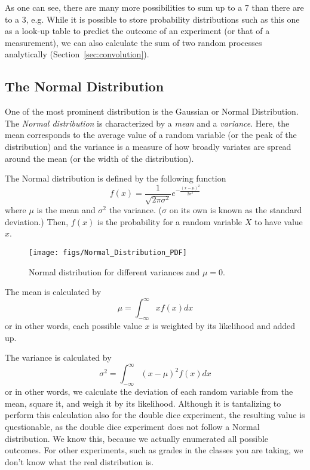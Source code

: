 As one can see, there are many more possibilities to sum up to a 7 than there are to a 3, e.g. While it is possible to store probability distributions such as this one as a look-up table to predict the outcome of an experiment (or that of a measurement), we can also calculate the sum of two random processes analytically (Section~\ref{sec:convolution}).


\subsection{The Normal Distribution}
One of the most prominent distribution is the Gaussian or Normal Distribution. The \emph{Normal distribution} is characterized by a \emph{mean} and a \emph{variance}. Here, the mean corresponds to the average value of a random variable (or the peak of the distribution) and the variance is a measure of how broadly variates are spread around the mean (or the width of the distribution).

 The Normal distribution is defined by the following function
 \begin{equation}
f(x)=\frac{1}{\sqrt{2\pi\sigma^2}}e^{-\frac{(x-\mu)^2}{2\sigma^2}}
\end{equation}
where $ \mu$ is the mean and $ \sigma^2$ the variance. ($ \sigma$ on its own is known as the standard deviation.) Then, $ f(x)$ is the probability for a random variable $ X$ to have value $ x$.

\begin{figure}
	\centering
		\texttt{[image: figs/Normal\_Distribution\_PDF]}
	\caption{Normal distribution for different variances and $\mu=0$.}
	\label{fig:Normal_Distribution_PDF}
\end{figure}

The mean is calculated by
\begin{equation}
\mu=\int_{-\infty}^{\infty}xf(x)dx
\end{equation}
or in other words, each possible value $ x$ is weighted by its likelihood and added up.

The variance is calculated by
\begin{equation}
\sigma^2=\int_{-\infty}^{\infty}(x-\mu)^2f(x)dx
\end{equation}
or in other words, we calculate the deviation of each random variable from the mean, square it, and weigh it by its likelihood. Although it is tantalizing to perform this calculation also for the double dice experiment, the resulting value is questionable, as the double dice experiment does not follow a Normal distribution. We know this, because we actually enumerated all possible outcomes. For other experiments, such as grades in the classes you are taking, we don't know what the real distribution is.


